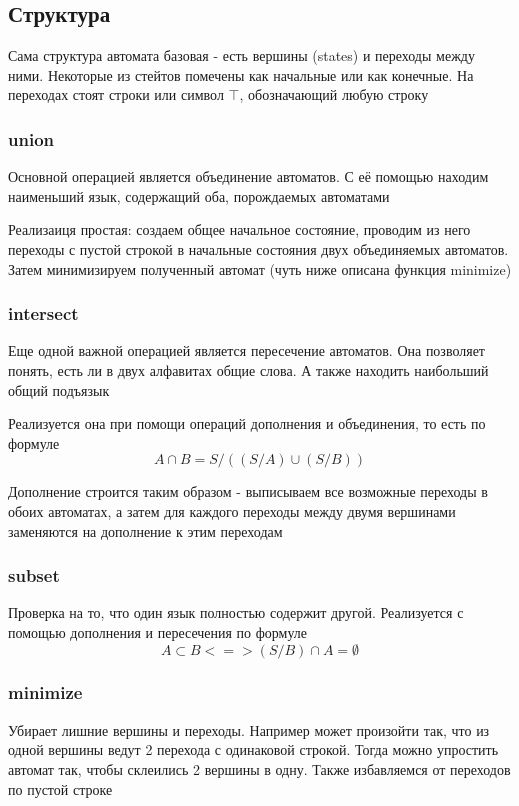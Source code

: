 \newpage
\subsection{Структура}
Сама структура автомата базовая - есть вершины (states) и переходы между ними. Некоторые из стейтов помечены как начальные или как конечные. На переходах стоят строки или символ $\top$, обозначающий любую строку

\subsubsection*{union}
Основной операцией является объединение автоматов. С её помощью находим наименьший язык, содержащий оба, порождаемых автоматами

Реализаиця простая: создаем общее начальное состояние, проводим из него переходы с пустой строкой в начальные состояния двух объединяемых автоматов. Затем минимизируем полученный автомат (чуть ниже описана функция minimize)

\subsubsection*{intersect}
Еще одной важной операцией является пересечение автоматов. Она позволяет понять, есть ли в двух алфавитах общие слова. А также находить наибольший общий подъязык

Реализуется она при помощи операций дополнения и объединения, то есть по формуле \[A \cap B = S / ((S / A) \cup (S / B))\]

Дополнение строится таким образом - выписываем все возможные переходы в обоих автоматах, а затем для каждого переходы между двумя вершинами заменяются на дополнение к этим переходам

\subsubsection*{subset}
Проверка на то, что один язык полностью содержит другой. Реализуется с помощью дополнения и пересечения по формуле
\[A \subset B <=> (S / B) \cap A = \emptyset\]

\subsubsection*{minimize}
Убирает лишние вершины и переходы. Например может произойти так, что из одной вершины ведут 2 перехода с одинаковой строкой. Тогда можно упростить автомат так, чтобы склеились 2 вершины в одну. Также избавляемся от переходов по пустой строке

